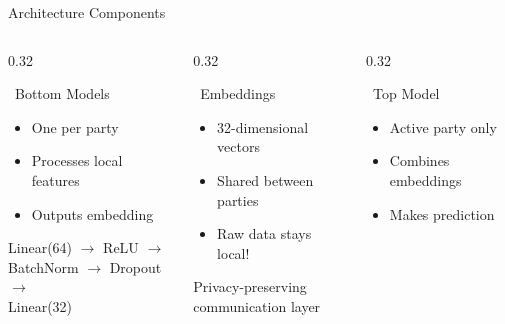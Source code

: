 \documentclass[aspectratio=169, 11pt]{beamer}
\begin{document}
\begin{frame}{Architecture Components}
    \begin{columns}[T]
        \begin{column}{0.32\textwidth}
            \begin{block}{\faCubes\ Bottom Models}
                \begin{itemize}
                    \item One per party
                    \item Processes local features
                    \item Outputs embedding
                \end{itemize}
                
                \vspace{0.3em}
                \small
                Linear(64) $\rightarrow$ ReLU $\rightarrow$\\
                BatchNorm $\rightarrow$ Dropout $\rightarrow$\\
                Linear(32)
            \end{block}
        \end{column}
        
        \begin{column}{0.32\textwidth}
            \begin{block}{\faExchangeAlt\ Embeddings}
                \begin{itemize}
                    \item 32-dimensional vectors
                    \item Shared between parties
                    \item Raw data stays local!
                \end{itemize}
                
                \vspace{0.3em}
                \small
                Privacy-preserving\\
                communication layer
            \end{block}
        \end{column}
        
        \begin{column}{0.32\textwidth}
            \begin{block}{\faSitemap\ Top Model}
                \begin{itemize}
                    \item Active party only
                    \item Combines embeddings
                    \item Makes prediction
                \end{itemize}
                

\end{block}
\end{column}
\end{columns}
\end{frame}
\end{document}
